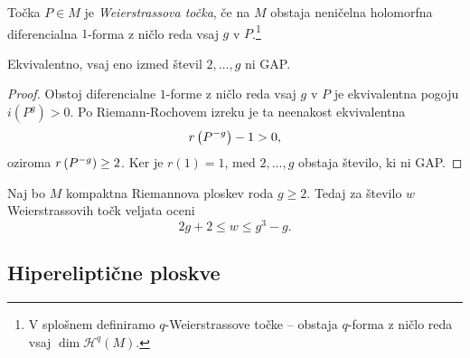 \begin{definicija}
Točka $P \in M$ je \emph{Weierstrassova točka}, če na $M$ obstaja
neničelna holomorfna diferencialna $1$-forma z ničlo reda vsaj
$g$ v $P$.\footnote{V splošnem definiramo $q$-Weierstrassove točke
-- obstaja $q$-forma z ničlo reda vsaj $\dim \mathscr{H}^q(M)$.}
\end{definicija}

\begin{lema}
Ekvivalentno, vsaj eno izmed števil $2, \dots, g$ ni GAP.
\end{lema}

\begin{proof}
Obstoj diferencialne $1$-forme z ničlo reda vsaj $g$ v $P$ je
ekvivalentna pogoju $i(P^g) > 0$. Po Riemann-Rochovem izreku je ta
neenakost ekvivalentna
\[
r \left(P^{-g}\right) - 1 > 0,
\]
oziroma $r \left(P^{-g}\right) \geq 2$. Ker je $r(1) = 1$, med
$2, \dots, g$ obstaja število, ki ni GAP.
\end{proof}

\begin{lema}
Naj bo $M$ kompaktna Riemannova ploskev roda $g \geq 2$. Tedaj za
število $w$ Weierstrassovih točk veljata oceni
\[
2g + 2 \leq w \leq g^3 - g.
\]
\end{lema}

\subsection{Hipereliptične ploskve}
